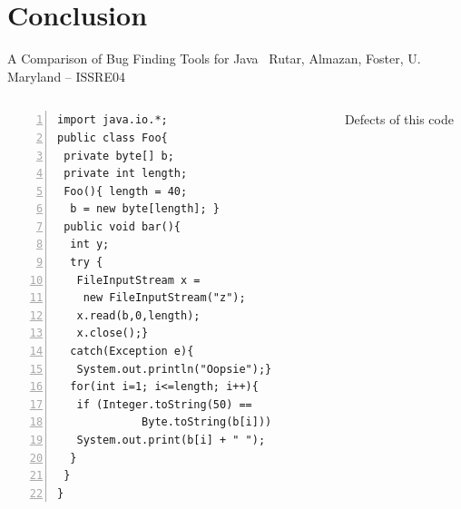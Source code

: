 \section{Conclusion}\mypartpage
\begin{frame}{A Comparison of Bug Finding Tools for Java}
  \vspace{-1.2\baselineskip}~\hfill{\footnotesize Rutar, Almazan, Foster,
    U. Maryland -- ISSRE04}
  \medskip
  \begin{columns}
    \begin{column}{.41\linewidth}
      \begin{Verbatim}[frame=single,label=Example code,fontsize=\footnotesize,numbers=left,numbersep=1pt]
import java.io.*;
public class Foo{
 private byte[] b;
 private int length;
 Foo(){ length = 40;
  b = new byte[length]; }
 public void bar(){
  int y;
  try {
   FileInputStream x =
    new FileInputStream("z");
   x.read(b,0,length);
   x.close();}
  catch(Exception e){
   System.out.println("Oopsie");}
  for(int i=1; i<=length; i++){
   if (Integer.toString(50) ==
             Byte.toString(b[i]))
   System.out.print(b[i] + " ");
  }
 }
}
      \end{Verbatim}
    \end{column}
    \begin{column}{.55\linewidth}
      \begin{block}{Defects of this code}
      \end{block}\vspace{-.6\baselineskip}


\end{column}
\end{columns}
\end{frame}
